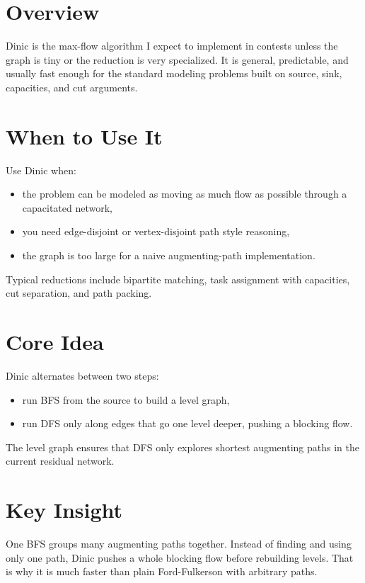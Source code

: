\section*{Overview}

Dinic is the max-flow algorithm I expect to implement in contests unless the graph is tiny or the reduction is very
specialized. It is general, predictable, and usually fast enough for the standard modeling problems built on source,
sink, capacities, and cut arguments.

\section*{When to Use It}

Use Dinic when:

\begin{itemize}
  \item the problem can be modeled as moving as much flow as possible through a capacitated network,
  \item you need edge-disjoint or vertex-disjoint path style reasoning,
  \item the graph is too large for a naive augmenting-path implementation.
\end{itemize}

Typical reductions include bipartite matching, task assignment with capacities, cut separation, and path packing.

\section*{Core Idea}

Dinic alternates between two steps:

\begin{itemize}
  \item run BFS from the source to build a level graph,
  \item run DFS only along edges that go one level deeper, pushing a blocking flow.
\end{itemize}

The level graph ensures that DFS only explores shortest augmenting paths in the current residual network.

\section*{Key Insight}

One BFS groups many augmenting paths together. Instead of finding and using only one path, Dinic pushes a whole
blocking flow before rebuilding levels. That is why it is much faster than plain Ford-Fulkerson with arbitrary paths.

